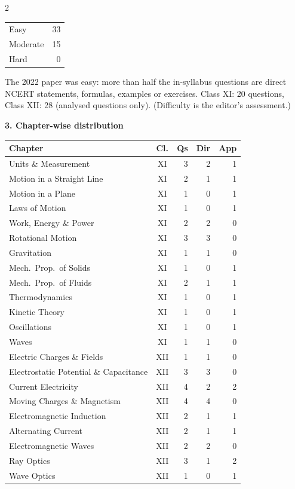 \begin{multicols}{2}
\begin{tabular}{@{}lr@{}}
Easy & 33\\ Moderate & 15\\ Hard & 0\\\bottomrule\end{tabular}\par\smallskip
{\footnotesize The 2022 paper was easy: more than half the in-syllabus questions are direct NCERT statements, formulas, examples or exercises. Class XI: 20 questions, Class XII: 28 (analysed questions only). (Difficulty is the editor's assessment.)}\par\medskip
\columnbreak
\textbf{\color{crimson}3. Chapter-wise distribution}\par\smallskip
{\footnotesize\begin{tabular}{@{}p{4.7cm}c@{\,}r@{\,}r@{\,}r@{}}\toprule
Chapter & Cl. & Qs & Dir & App\\\midrule
Units \& Measurement & XI & 3 & 2 & 1\\
Motion in a Straight Line & XI & 2 & 1 & 1\\
Motion in a Plane & XI & 1 & 0 & 1\\
Laws of Motion & XI & 1 & 0 & 1\\
Work, Energy \& Power & XI & 2 & 2 & 0\\
Rotational Motion & XI & 3 & 3 & 0\\
Gravitation & XI & 1 & 1 & 0\\
Mech.\ Prop.\ of Solids & XI & 1 & 0 & 1\\
Mech.\ Prop.\ of Fluids & XI & 2 & 1 & 1\\
Thermodynamics & XI & 1 & 0 & 1\\
Kinetic Theory & XI & 1 & 0 & 1\\
Oscillations & XI & 1 & 0 & 1\\
Waves & XI & 1 & 1 & 0\\
Electric Charges \& Fields & XII & 1 & 1 & 0\\
Electrostatic Potential \& Capacitance & XII & 3 & 3 & 0\\
Current Electricity & XII & 4 & 2 & 2\\
Moving Charges \& Magnetism & XII & 4 & 4 & 0\\
Electromagnetic Induction & XII & 2 & 1 & 1\\
Alternating Current & XII & 2 & 1 & 1\\
Electromagnetic Waves & XII & 2 & 2 & 0\\
Ray Optics & XII & 3 & 1 & 2\\
Wave Optics & XII & 1 & 0 & 1\\

\end{tabular}}
\end{multicols}
